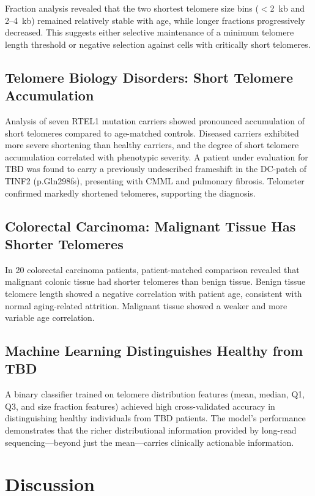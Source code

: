 \documentclass[11pt]{article}
\begin{document}
Fraction analysis revealed that the two shortest telomere size bins ($<$2~kb and 2--4~kb) remained relatively stable with age, while longer fractions progressively decreased. This suggests either selective maintenance of a minimum telomere length threshold or negative selection against cells with critically short telomeres.

\subsection{Telomere Biology Disorders: Short Telomere Accumulation}

Analysis of seven RTEL1 mutation carriers showed pronounced accumulation of short telomeres compared to age-matched controls. Diseased carriers exhibited more severe shortening than healthy carriers, and the degree of short telomere accumulation correlated with phenotypic severity. A patient under evaluation for TBD was found to carry a previously undescribed frameshift in the DC-patch of TINF2 (p.Gln298fs), presenting with CMML and pulmonary fibrosis. Telometer confirmed markedly shortened telomeres, supporting the diagnosis.

\subsection{Colorectal Carcinoma: Malignant Tissue Has Shorter Telomeres}

In 20 colorectal carcinoma patients, patient-matched comparison revealed that malignant colonic tissue had shorter telomeres than benign tissue. Benign tissue telomere length showed a negative correlation with patient age, consistent with normal aging-related attrition. Malignant tissue showed a weaker and more variable age correlation.

\subsection{Machine Learning Distinguishes Healthy from TBD}

A binary classifier trained on telomere distribution features (mean, median, Q1, Q3, and size fraction features) achieved high cross-validated accuracy in distinguishing healthy individuals from TBD patients. The model's performance demonstrates that the richer distributional information provided by long-read sequencing---beyond just the mean---carries clinically actionable information.

\section{Discussion}
\end{document}
